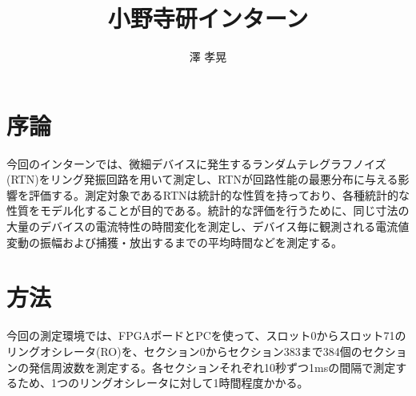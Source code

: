 \documentclass{jsarticle}
\begin{document}
\title{小野寺研インターン}
\author{澤 孝晃}
\maketitle

\section{序論}

今回のインターンでは、微細デバイスに発生するランダムテレグラフノイズ(RTN)をリング発振回路を用いて測定し、RTNが回路性能の最悪分布に与える影響を評価する。測定対象であるRTNは統計的な性質を持っており、各種統計的な性質をモデル化することが目的である。統計的な評価を行うために、同じ寸法の大量のデバイスの電流特性の時間変化を測定し、デバイス毎に観測される電流値変動の振幅および捕獲・放出するまでの平均時間などを測定する。

\section{方法}

今回の測定環境では、FPGAボードとPCを使って、スロット0からスロット71のリングオシレータ(RO)を、セクション0からセクション383まで384個のセクションの発信周波数を測定する。各セクションそれぞれ10秒ずつ1msの間隔で測定するため、1つのリングオシレータに対して1時間程度かかる。



\end{document}
